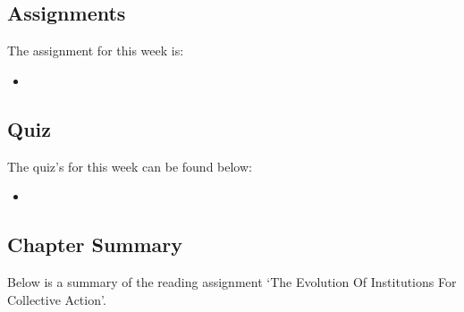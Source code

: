 \subsection{Assignments}

The assignment for this week is:

\begin{itemize}
    \item {}
\end{itemize}

\subsection{Quiz}

The quiz's for this week can be found below:

\begin{itemize}
    \item {}
\end{itemize}

\subsection{Chapter Summary}

Below is a summary of the reading assignment `The Evolution Of Institutions For Collective Action'.

